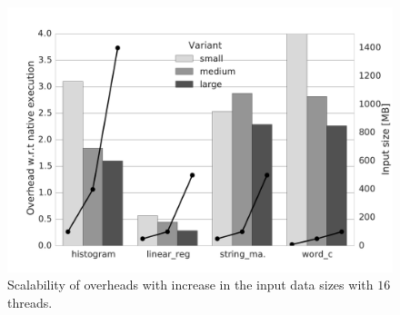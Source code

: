 
\begin{figure}[t]
\centering
\includegraphics[scale=0.25]{figure/benchmarks/worksize-times-Total_overheads.pdf}
\caption{Scalability of overheads with increase in the input data sizes with $16$ threads. }
\label{fig:data-size-overheads}
\end{figure}

